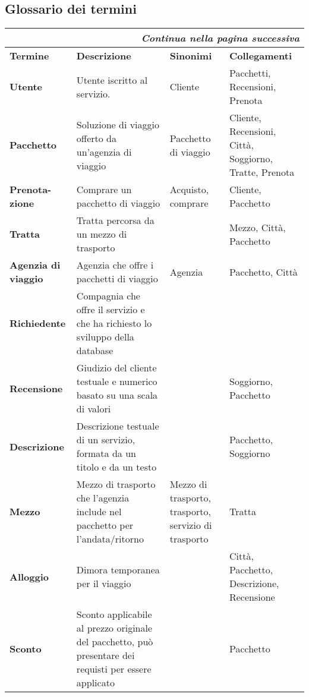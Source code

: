 \subsection{Glossario dei termini}
\begin{center}
    \begin{tabularx}{\textwidth}{p{} X p{} p{}}
        \caption{Dizionario termini}\\\toprule\endfirsthead
        \toprule\endhead
        \midrule\multicolumn{4}{r}{\itshape Continua nella pagina successiva}\\\midrule\endfoot
        \bottomrule\endlastfoot
        \textbf{Termine} & \textbf{Descrizione} & \textbf{Sinonimi} & \textbf{Collegamenti} \\
        \midrule
        \textbf{Utente} & Utente iscritto al servizio. & Cliente & Pacchetti, Recensioni, Prenota
        \\\midrule
        \textbf{Pacchetto} & Soluzione di viaggio offerto da un'agenzia di viaggio & Pacchetto di viaggio & Cliente, Recensioni, Città, Soggiorno, Tratte, Prenota
        \\\midrule
        \textbf{Prenota-zione} & Comprare un pacchetto di viaggio & Acquisto, comprare & Cliente, Pacchetto
        \\\midrule
        \textbf{Tratta} & Tratta percorsa da un mezzo di trasporto & & Mezzo, Città, Pacchetto
        \\\midrule
        \textbf{Agenzia di viaggio} & Agenzia che offre i pacchetti di viaggio & Agenzia & Pacchetto, Città
        \\\midrule
        \textbf{Richiedente} & Compagnia che offre il servizio e che ha richiesto lo sviluppo della database & &
        \\\midrule
        \textbf{Recensione} & Giudizio del cliente testuale e numerico basato su una scala di valori & & Soggiorno, Pacchetto %
        \\\midrule
        \textbf{Descrizione} & Descrizione testuale di un servizio, formata da un titolo e da un testo & & Pacchetto, Soggiorno
        \\\midrule
        \textbf{Mezzo} & Mezzo di trasporto che l'agenzia include nel pacchetto per l'andata/ritorno & Mezzo di trasporto, trasporto, servizio di trasporto & Tratta
        \\\midrule
        \textbf{Alloggio} & Dimora temporanea per il viaggio & & Città, Pacchetto, Descrizione, Recensione
        \\\midrule
        \textbf{Sconto} & Sconto applicabile al prezzo originale del pacchetto, può presentare dei requisti per essere applicato & & Pacchetto
        \\
    \end{tabularx}
\end{center}

